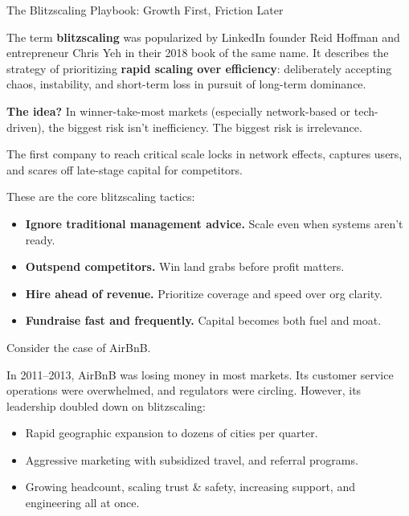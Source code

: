\begin{HistoricalSidebar}{The Blitzscaling Playbook: Growth First, Friction Later}

  The term \textbf{blitzscaling} was popularized by LinkedIn founder Reid Hoffman and entrepreneur Chris Yeh in their 
  2018 book of the same name.  
  It describes the strategy of prioritizing \textbf{rapid scaling over efficiency}: deliberately accepting chaos, instability, 
  and short-term loss in pursuit of long-term dominance.
  
  \medskip
  
  \textbf{The idea?} In winner-take-most markets (especially network-based or tech-driven), the biggest risk isn’t 
  inefficiency. The biggest risk is irrelevance.  

  \medskip

  The first company to reach critical scale locks in network effects, captures users, and scares off late-stage capital 
  for competitors.
  
  \medskip
  
  These are the core blitzscaling tactics:

  \medskip
  
  \begin{itemize}
    \item \textbf{Ignore traditional management advice.} Scale even when systems aren’t ready.
    \item \textbf{Outspend competitors.} Win land grabs before profit matters.
    \item \textbf{Hire ahead of revenue.} Prioritize coverage and speed over org clarity.
    \item \textbf{Fundraise fast and frequently.} Capital becomes both fuel and moat.
  \end{itemize}
  
  \medskip
  
  
  Consider the case of AirBnB. 

  \medskip
  
  In 2011–2013, AirBnB was losing money in most markets. Its customer service operations were 
  overwhelmed, and regulators were circling. However, its leadership doubled down on blitzscaling:
  
  \begin{itemize}
    \item Rapid geographic expansion to dozens of cities per quarter.
    \item Aggressive marketing with subsidized travel, and referral programs.
    \item Growing headcount, scaling trust \& safety, increasing support, and engineering all at once.
  \end{itemize}
  

\end{HistoricalSidebar}
